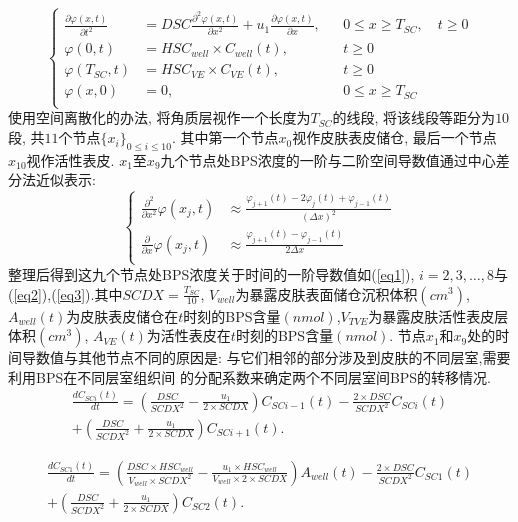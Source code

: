 \documentclass[a4paper,punct=banjiao,twoside]{ctexrep}
\theoremstyle{plain}
\theoremstyle{definition}
\theoremstyle{remark}
\begin{document}
\begin{equation}\label{eq0}
  \left\{\begin{aligned}
    \frac{\partial \varphi(x,t) }{\partial t^2} &= DSC \frac{\partial^2 \varphi(x,t)}{\partial x^2} + u_1 \frac{\partial \varphi(x,t)}{\partial x}, && 0\leq x \geq T_{SC}, \quad t\geq 0\\
    \varphi(0,t) &= HSC_{well} \times C_{well}(t), &&t\geq 0\\
    \varphi(T_{SC},t) &= HSC_{VE} \times C_{VE}(t), &&t\geq 0\\
    \varphi(x,0) &= 0, &&0\leq x \geq T_{SC}\\
  \end{aligned}\right.
  \end{equation}
\noindent 使用空间离散化的办法, 将角质层视作一个长度为$T_{SC}$的线段, 将该线段等距分为$10$段, 共$11$个节点$\{x_i\}_{0\leq i\leq 10}$. 其中第一个节点$x_0$视作皮肤表皮储仓, 最后一个节点$x_{10}$视作活性表皮.
$x_1$至$x_9$九个节点处BPS浓度的一阶与二阶空间导数值通过中心差分法近似表示: 
\begin{equation}\label{eq1.1}
  \left\{\begin{aligned}
    \frac{\partial^2}{\partial x^2}\varphi(x_j, t) &\approx \frac{\varphi_{j+1}(t) - 2\varphi_j(t) + \varphi_{j-1}(t)}{(\Delta x)^2}\\
    \frac{\partial}{\partial x}\varphi(x_j, t) &\approx \frac{\varphi_{j+1}(t) - \varphi_{j-1}(t)}{2\Delta x}\\
  \end{aligned}\right.
  \end{equation}
  \noindent 整理后得到这九个节点处BPS浓度关于时间的一阶导数值如(\ref{eq1}), $i=2,3,\dots,8$与(\ref{eq2}),(\ref{eq3}).其中$SCDX = \frac{T_{SC}}{10}$, 
  $V_{well}$为暴露皮肤表面储仓沉积体积$(cm^3)$, $A_{well}(t)$为皮肤表皮储仓在$t$时刻的BPS含量$(nmol)$,$V_{TVE}$为暴露皮肤活性表皮层体积$(cm^3)$, $A_{VE}(t)$为活性表皮在$t$时刻的BPS含量$(nmol)$.
  节点$x_1$和$x_9$处的时间导数值与其他节点不同的原因是: 与它们相邻的部分涉及到皮肤的不同层室,需要利用BPS在不同层室组织间
  的分配系数来确定两个不同层室间BPS的转移情况. 
\begin{multline}\label{eq1}
  \frac{dC_{SCi}(t)}{dt}=\left(\frac{DSC}{SCDX^2} -\frac{u_1}{2 \times  SCDX}\right)C_{SCi-1}(t)-\frac{2 \times DSC}{SCDX^2}  C_{SCi}(t)\\
  +\left(\frac{DSC}{SCDX^2}+\frac{u_1}{2 \times  SCDX}\right)C_{SCi+1}(t).
\end{multline}

\begin{multline}\label{eq2}
  \frac{dC_{SC1}(t)}{dt}=\left(\frac{DSC \times  HSC_{well}}{V_{well}  \times  SCDX^2 }-\frac{u_1  \times  HSC_{well}}{V_{well}  \times  2 \times  SCDX}\right)A_{well}(t)   -\frac{2 \times DSC}{SCDX^2}  C_{SC1}(t)\\
  +\left(\frac{DSC}{SCDX^2}+\frac{u_1}{2 \times  SCDX}\right)C_{SC2}(t).
\end{multline}
\end{document}
